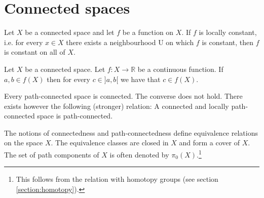 \section{Connected spaces}


    \begin{property}
        Let $X$ be a connected space and let $f$ be a function on $X$. If $f$ is locally constant, i.e. for every $x\in X$ there exists a neighbourhood U on which $f$ is constant, then $f$ is constant on all of $X$.
    \end{property}

    \begin{theorem}\label{topology:theorem:intermediate_value_theorem}
        Let $X$ be a connected space. Let $f:X\rightarrow\mathbb{R}$ be a continuous function. If $a, b\in f(X)$ then for every $c\in ]a, b[$ we have that $c\in f(X)$.
    \end{theorem}


    \begin{property}
        Every path-connected space is connected. The converse does not hold. There exists however the following (stronger) relation: A connected and locally path-connected space is path-connected.
    \end{property}

    \begin{remark}
        The notions of connectedness and path-connectedness define equivalence relations on the space $X$. The equivalence classes are closed in $X$ and form a cover of $X$. The set of path components of $X$ is often denoted by $\pi_0(X)$.\footnote{This follows from the relation with homotopy groups (see section \ref{section:homotopy}).}
    \end{remark}


